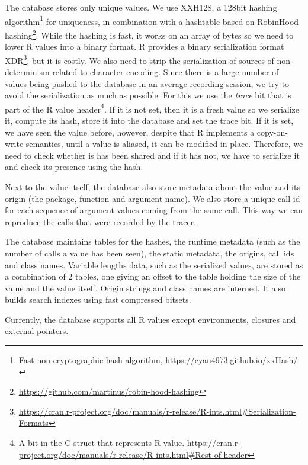 \documentclass[sigplan,anonymous,review]{acmart}
\begin{document}
The database stores only unique values.
We use XXH128, a 128bit hashing algorithm\footnote{Fast non-cryptographic hash algorithm, \Cf \url{https://cyan4973.github.io/xxHash/}} for uniqueness, in combination with a hashtable based on RobinHood hashing\footnote{\url{https://github.com/martinus/robin-hood-hashing}}.
While the hashing is fast, it works on an array of bytes so we need to lower R values into a binary format.
R provides a binary serialization format XDR\footnote{\Cf \url{https://cran.r-project.org/doc/manuals/r-release/R-ints.html\#Serialization-Formats}}, but it is costly. We also need to strip the serialization of sources of non-determinism related to character encoding.
Since there is a large number of values being pushed to the database in an average recording session, we try to avoid the serialization as much as possible.
For this we use the \emph{trace} bit that is part of the R value header\footnote{A bit in the  C struct that represents R value. \Cf \url{https://cran.r-project.org/doc/manuals/r-release/R-ints.html\#Rest-of-header}}.
If it is not set, then it is a fresh value so we serialize it, compute its hash, store it into the database and set the trace bit.
If it is set, we have seen the value before, however, despite that R implements a copy-on-write semantics, until a value is aliased, it can be modified in place.
Therefore, we need to check whether is has been shared and if it has not, we have to serialize it and check its presence using the hash.


Next to the value itself, the database also store metadata about the value and its origin (the package, function and argument name).
We also store a unique call id for each sequence of argument values coming from the same call.
This way we can reproduce the calls that were recorded by the tracer.

The database maintains tables for the hashes, the runtime metadata (such as the number of calls a value has been seen), the static metadata, the origins, call ids and class names. Variable lengths data, such as the serialized values, are stored as a combination of 2 tables, one giving an offset to the table holding the size of the value and the value itself. Origin strings and class names are interned. It also builds search indexes using fast compressed bitsets\cite{chambi2016better}.

Currently, the database supports all R values except environments, closures  and external pointers.
\end{document}
